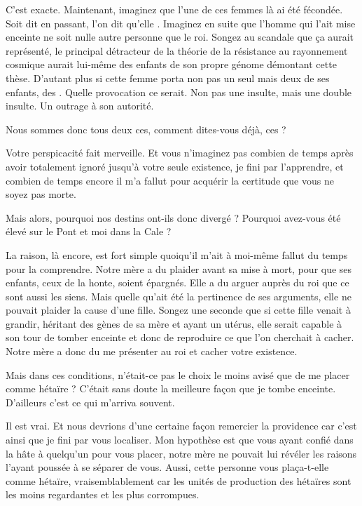 \begin{drama}
   \elenaspeaks C’est exacte. Maintenant, imaginez que l’une de ces femmes là ai été fécondée. Soit dit en passant, l’on dit qu’elle . Imaginez en suite que l’homme qui l’ait mise enceinte ne soit nulle autre personne que le roi. Songez au scandale que ça aurait représenté, le principal détracteur de la théorie de la résistance au rayonnement cosmique aurait lui-même des enfants de son propre génome démontant cette thèse. D’autant plus si cette femme porta non pas un seul mais deux de ses enfants, des . Quelle provocation ce serait. Non pas une insulte, mais une double insulte. Un outrage à son autorité.

   \elaspeaks Nous sommes donc tous deux ces, comment dites-vous déjà, ces  ?

   \elenaspeaks Votre perspicacité fait merveille. Et vous n’imaginez pas combien de temps après avoir totalement ignoré jusqu’à votre seule existence, je fini par l’apprendre, et combien de temps encore il m’a fallut pour acquérir la certitude que vous ne soyez pas morte.

   \elaspeaks Mais alors, pourquoi nos destins ont-ils donc divergé ? Pourquoi avez-vous été élevé sur le Pont et moi dans la Cale ?

   \elenaspeaks La raison, là encore, est fort simple quoiqu’il m’ait à moi-même fallut du temps pour la comprendre. Notre mère a du plaider avant sa mise à mort, pour que ses enfants, ceux de la honte, soient épargnés. Elle a du arguer auprès du roi que ce sont aussi les siens. Mais quelle qu’ait été la pertinence de ses arguments, elle ne pouvait plaider la cause d’une fille. Songez une seconde que si cette fille venait à grandir, héritant des gènes de sa mère et ayant un utérus, elle serait capable à son tour de tomber enceinte et donc de reproduire ce que l’on cherchait à cacher. Notre mère a donc du me présenter au roi et cacher votre existence.

   \elaspeaks Mais dans ces conditions, n’était-ce pas le choix le moins avisé que de me placer comme hétaïre ? C’était sans doute la meilleure façon que je tombe enceinte. D’ailleurs c’est ce qui m’arriva souvent.

   \elenaspeaks Il est vrai. Et nous devrions d’une certaine façon remercier la providence car c’est ainsi que je fini par vous localiser. Mon hypothèse est que vous ayant confié dans la hâte à quelqu’un pour vous placer, notre mère ne pouvait lui révéler les raisons l’ayant poussée à se séparer de vous. Aussi, cette personne vous plaça-t-elle comme hétaïre, vraisemblablement car les unités de production des hétaïres sont les moins regardantes et les plus corrompues.


\end{drama}
